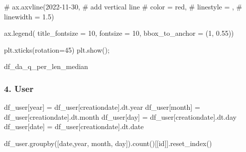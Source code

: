 \documentclass[
  letterpaper,
  DIV=11,
  numbers=noendperiod]{scrartcl}
\newenvironment{Shaded}{\begin{snugshade}}{\end{snugshade}}
\newcommand{\CommentTok}[1]{\textcolor[rgb]{0.37,0.37,0.37}{#1}}
\newcommand{\DecValTok}[1]{\textcolor[rgb]{0.68,0.00,0.00}{#1}}
\newcommand{\FloatTok}[1]{\textcolor[rgb]{0.68,0.00,0.00}{#1}}
\newcommand{\NormalTok}[1]{\textcolor[rgb]{0.00,0.23,0.31}{#1}}
\newcommand{\OperatorTok}[1]{\textcolor[rgb]{0.37,0.37,0.37}{#1}}
\newcommand{\StringTok}[1]{\textcolor[rgb]{0.13,0.47,0.30}{#1}}
\begin{document}
\begin{Shaded}
\begin{Highlighting}[]
\CommentTok{\# ax.axvline(\textquotesingle{}2022{-}11{-}30\textquotesingle{}, \# add vertical line}
\CommentTok{\#            color = \textquotesingle{}red\textquotesingle{},}
\CommentTok{\#            linestyle = \textquotesingle{}{-}{-}\textquotesingle{},}
\CommentTok{\#            linewidth = 1.5)}

\NormalTok{ax.legend( title\_fontsize }\OperatorTok{=} \DecValTok{10}\NormalTok{, fontsize }\OperatorTok{=} \DecValTok{10}\NormalTok{,}
\NormalTok{          bbox\_to\_anchor }\OperatorTok{=}\NormalTok{ (}\DecValTok{1}\NormalTok{, }\FloatTok{0.55}\NormalTok{))}

\NormalTok{plt.xticks(rotation}\OperatorTok{=}\DecValTok{45}\NormalTok{)}
\NormalTok{plt.show()}\OperatorTok{;}
\end{Highlighting}
\end{Shaded}

\begin{Shaded}
\begin{Highlighting}[]
\NormalTok{df\_da\_q\_per\_len\_median}
\end{Highlighting}
\end{Shaded}

\subsubsection{4. User}\label{user}

\begin{Shaded}
\begin{Highlighting}[]
\NormalTok{df\_user[}\StringTok{\textquotesingle{}year\textquotesingle{}}\NormalTok{] }\OperatorTok{=}\NormalTok{ df\_user[}\StringTok{\textquotesingle{}creationdate\textquotesingle{}}\NormalTok{].dt.year}
\NormalTok{df\_user[}\StringTok{\textquotesingle{}month\textquotesingle{}}\NormalTok{] }\OperatorTok{=}\NormalTok{ df\_user[}\StringTok{\textquotesingle{}creationdate\textquotesingle{}}\NormalTok{].dt.month}
\NormalTok{df\_user[}\StringTok{\textquotesingle{}day\textquotesingle{}}\NormalTok{] }\OperatorTok{=}\NormalTok{ df\_user[}\StringTok{\textquotesingle{}creationdate\textquotesingle{}}\NormalTok{].dt.day}
\NormalTok{df\_user[}\StringTok{\textquotesingle{}date\textquotesingle{}}\NormalTok{] }\OperatorTok{=}\NormalTok{ df\_user[}\StringTok{\textquotesingle{}creationdate\textquotesingle{}}\NormalTok{].dt.date}
\end{Highlighting}
\end{Shaded}

\begin{Shaded}
\begin{Highlighting}[]
\NormalTok{df\_user.groupby([}\StringTok{\textquotesingle{}date\textquotesingle{}}\NormalTok{,}\StringTok{\textquotesingle{}year\textquotesingle{}}\NormalTok{, }\StringTok{\textquotesingle{}month\textquotesingle{}}\NormalTok{, }\StringTok{\textquotesingle{}day\textquotesingle{}}\NormalTok{]).count()[[}\StringTok{\textquotesingle{}id\textquotesingle{}}\NormalTok{]].reset\_index()}
\end{Highlighting}
\end{Shaded}
\end{document}

